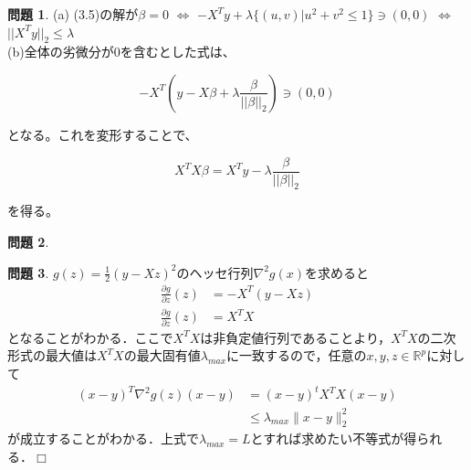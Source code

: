 \documentclass[titlepage]{jsarticle}
\theoremstyle{definition}
\newtheorem{Ex}{問題}
\theoremstyle{mystyle} %
\def\qed{\hfill$\Box$}
\begin{document}
\begin{Ex}
\noindent(a) (3.5)の解が$\beta=0$ $\Leftrightarrow$ $-X^Ty+\lambda\{(u, v)|u^2+v^2\le 1\}\ni (0, 0)$ $\Leftrightarrow$ $||X^Ty||_2\le \lambda$\\[1mm]

\noindent(b)全体の劣微分が0を含むとした式は、


\begin{equation*}
-X^T(y-X\beta +\lambda \frac{\beta}{||\beta||_2})\ni (0, 0)
\end{equation*}

となる。これを変形することで、

\begin{equation*}
X^TX\beta = X^Ty-\lambda \frac{\beta}{||\beta||_2}
\end{equation*}

を得る。
\end{Ex}
\begin{Ex}

\end{Ex}
\begin{Ex}
$g(z)=\frac{1}{2}(y-Xz)^2$のヘッセ行列$\nabla^2 g(x)$を求めると
\begin{align*}
  \frac{\partial g}{\partial z}(z)&=-X^T(y-Xz)\\
  \frac{\partial g}{\partial z}(z)&=X^TX
\end{align*}
となることがわかる．ここで$X^TX$は非負定値行列であることより，$X^TX$の二次形式の最大値は$X^TX$の最大固有値$\lambda_{max}$に一致するので，任意の$x,y,z\in \mathbb{R}^p$に対して
\begin{align*}
  (x-y)^T \nabla^2g(z)(x-y)&=(x-y)^tX^TX(x-y)\\
  &\leq \lambda_{max}\|x-y\|_2^2
\end{align*}
が成立することがわかる．上式で$\lambda_{max}=L$とすれば求めたい不等式が得られる．\qed\\
\end{Ex}
\end{document}
